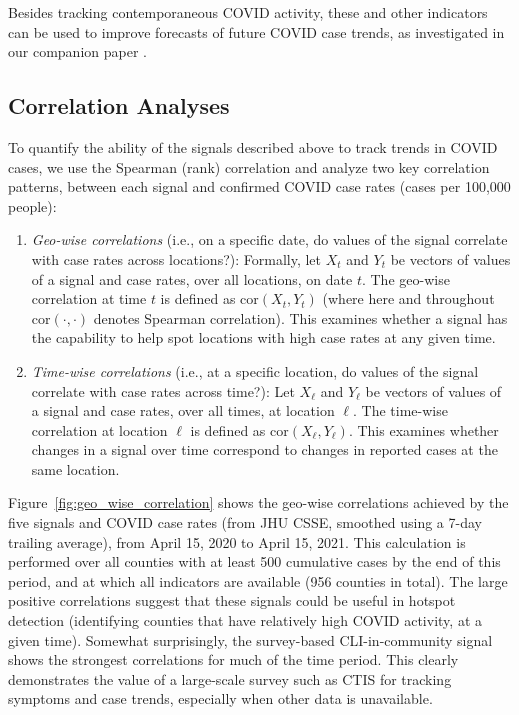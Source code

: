 \documentclass[9pt,twocolumn,twoside,lineno]{pnas-new}
\def\cor{\mathrm{cor}}
\begin{document}
Besides tracking contemporaneous COVID activity, these and other indicators can
be used to improve forecasts of future COVID case trends, as investigated in our
companion paper \cite{McDonald:2021}.

\subsection{Correlation Analyses}

To quantify the ability of the signals described above to track trends in COVID
cases, we use the Spearman (rank) correlation and analyze two key correlation
patterns, between each signal and confirmed COVID case rates (cases per 100,000
people):

\begin{enumerate}
\item \textit{Geo-wise correlations} (i.e., on a specific date, do values of the
  signal correlate with case rates across locations?): Formally, let $X_t$ and
  $Y_t$ be vectors of values of a signal and case rates, over all locations, on
  date $t$. The geo-wise correlation at time $t$ is defined as $\cor(X_t,
  Y_t)$ (where here and throughout $\cor(\cdot,\cdot)$ denotes Spearman
  correlation). This examines whether a signal has the capability to help spot
  locations with high case rates at any given time.

\item \textit{Time-wise correlations} (i.e., at a specific location, do values
  of the signal correlate with case rates across time?): Let $X_\ell$
  and $Y_\ell$ be vectors of values of a signal and case rates, over all
  times, at location $\ell$. The time-wise correlation at location $\ell$ is
  defined as $\cor(X_\ell, Y_\ell)$. This examines whether changes in a signal
  over time correspond to changes in reported cases at the same
  location.
\end{enumerate}

Figure~\ref{fig:geo_wise_correlation} shows the geo-wise correlations achieved
by the five signals and COVID case rates (from JHU CSSE, smoothed using a 7-day
trailing average), from April 15, 2020 to April 15, 2021. This calculation is
performed over all counties with at least 500 cumulative cases by the end of
this period, and at which all indicators are available (956 counties in total).
The large positive correlations suggest that these signals could be useful in
hotspot detection (identifying counties that have relatively high COVID
activity, at a given time). Somewhat surprisingly, the survey-based
CLI-in-community signal shows the strongest correlations for much of the time
period. This clearly demonstrates the value of a large-scale survey such as CTIS
for tracking symptoms and case trends, especially when other data is
unavailable. 
\end{document}
